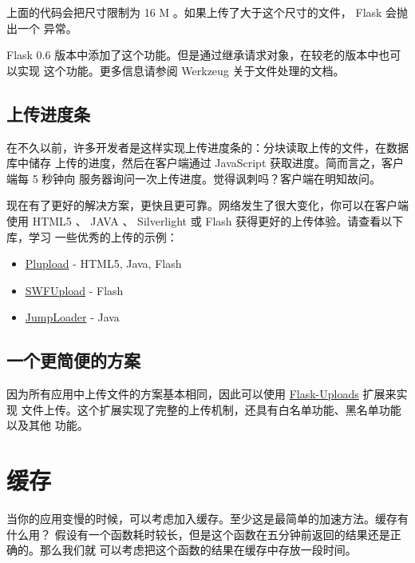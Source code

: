 \documentclass[a4paper,12pt]{sphinxmanual}
\begin{document}
上面的代码会把尺寸限制为 16 M 。如果上传了大于这个尺寸的文件， Flask 会抛出一个
\href{http://werkzeug.pocoo.org/docs/exceptions/\#werkzeug.exceptions.RequestEntityTooLarge}{} 异常。

Flask 0.6 版本中添加了这个功能。但是通过继承请求对象，在较老的版本中也可以实现
这个功能。更多信息请参阅 Werkzeug 关于文件处理的文档。


\subsection{上传进度条}
\label{patterns/fileuploads:id4}
在不久以前，许多开发者是这样实现上传进度条的：分块读取上传的文件，在数据库中储存
上传的进度，然后在客户端通过 JavaScript 获取进度。简而言之，客户端每 5 秒钟向
服务器询问一次上传进度。觉得讽刺吗？客户端在明知故问。

现在有了更好的解决方案，更快且更可靠。网络发生了很大变化，你可以在客户端使用
HTML5 、 JAVA 、 Silverlight 或 Flash 获得更好的上传体验。请查看以下库，学习
一些优秀的上传的示例：
\begin{itemize}
\item {} 
\href{http://www.plupload.com/}{Plupload} - HTML5, Java, Flash

\item {} 
\href{http://www.swfupload.org/}{SWFUpload} - Flash

\item {} 
\href{http://jumploader.com/}{JumpLoader} - Java

\end{itemize}


\subsection{一个更简便的方案}
\label{patterns/fileuploads:id5}
因为所有应用中上传文件的方案基本相同，因此可以使用 \href{http://packages.python.org/Flask-Uploads/}{Flask-Uploads} 扩展来实现
文件上传。这个扩展实现了完整的上传机制，还具有白名单功能、黑名单功能以及其他
功能。


\section{缓存}
\label{patterns/caching:caching-pattern}\label{patterns/caching::doc}\label{patterns/caching:flask-uploads}\label{patterns/caching:id1}
当你的应用变慢的时候，可以考虑加入缓存。至少这是最简单的加速方法。缓存有什么用？
假设有一个函数耗时较长，但是这个函数在五分钟前返回的结果还是正确的。那么我们就
可以考虑把这个函数的结果在缓存中存放一段时间。
\end{document}
